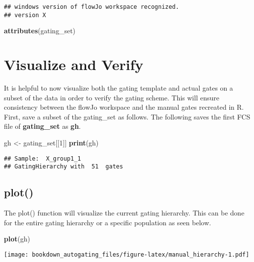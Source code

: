 \documentclass[]{book}
\newenvironment{Shaded}{\begin{snugshade}}{\end{snugshade}}
\newcommand{\DecValTok}[1]{\textcolor[rgb]{0.00,0.00,0.81}{#1}}
\newcommand{\KeywordTok}[1]{\textcolor[rgb]{0.13,0.29,0.53}{\textbf{#1}}}
\newcommand{\NormalTok}[1]{#1}
\newcommand{\StringTok}[1]{\textcolor[rgb]{0.31,0.60,0.02}{#1}}
\begin{document}
\begin{verbatim}
## windows version of flowJo workspace recognized.
## version X
\end{verbatim}

\begin{Shaded}
\begin{Highlighting}[]
\KeywordTok{attributes}\NormalTok{(gating_set)}
\end{Highlighting}
\end{Shaded}

\hypertarget{visualize-and-verify}{%
\section{Visualize and Verify}\label{visualize-and-verify}}

It is helpful to now visualize both the gating template and actual gates on a subset of the data in order to verify the gating scheme. This will ensure consistency between the flowJo workspace and the manual gates recreated in R. First, save a subset of the gating\_set as follows. The following saves the first FCS file of \textbf{gating\_set} as \textbf{gh}.

\begin{Shaded}
\begin{Highlighting}[]
\NormalTok{gh <-}\StringTok{ }\NormalTok{gating_set[[}\DecValTok{1}\NormalTok{]]}
\KeywordTok{print}\NormalTok{(gh)}
\end{Highlighting}
\end{Shaded}

\begin{verbatim}
## Sample:  X_group1_1 
## GatingHierarchy with  51  gates
\end{verbatim}

\hypertarget{plot}{%
\subsection{plot()}\label{plot}}

The plot() function will visualize the current gating hierarchy. This can be done for the entire gating hierarchy or a specific population as seen below.

\begin{Shaded}
\begin{Highlighting}[]
\KeywordTok{plot}\NormalTok{(gh)}
\end{Highlighting}
\end{Shaded}

\texttt{[image: bookdown\_autogating\_files/figure-latex/manual\_hierarchy-1.pdf]}
\end{document}
